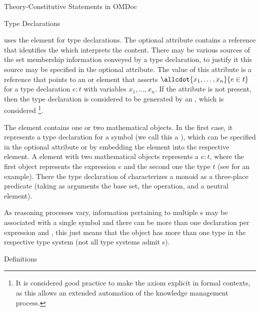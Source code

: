 \begin{omgroup}[short=Mathematical Statements,id=statements]
\begin{omgroup}[id=constitutive-statements]{Theory-Constitutive Statements in OMDoc}
\begin{module}[id=constitutive-statements]
\begin{omgroup}[id=type-axioms]{Type Declarations}
\begin{definition} [id=type.def]
  {\omdoc} uses the {} element for type declarations. The optional attribute
  {} contains a {} reference that identifies the
  {} which interprets the content. There may be various sources of
  the set membership information conveyed by a type declaration, to justify it this source
  may be specified in the optional {} attribute. The value of
  this attribute is a {} reference that points to an {}
  or {} element that asserts $\allcdot{x_1,\ldots,x_n}{e\in t}$ for a type
  declaration $e\colon t$ with variables $x_1,\ldots,x_n$.  If the
  {} attribute is not present, then the type declaration is
  considered to be generated by an {}, which is considered
  {}\footnote{It is considered good practice to make the
    axiom explicit in formal contexts, as this allows an extended automation of the
    knowledge management process.}.
  
  The {} element contains one or two mathematical objects. In the first
  case, it represents a type declaration for a symbol (we call this a
  {}), which can be specified in the optional
  {} attribute or by embedding the {} element into the
  respective {} element.  A {} element with two mathematical
  objects represents a {} $e\colon t$, where the first object
  represents the expression $e$ and the second one the type $t$ (see
  {} for an example). There the type declaration of
  {} characterizes a monoid as a three-place predicate (taking as
  arguments the base set, the operation, and a neutral element).
\end{definition}    

As reasoning processes vary, information pertaining to multiple {s}
may be associated with a single symbol and there can be more than one {}
declaration per expression and {}, this just means that the object
has more than one type in the respective type system (not all type systems admit
{s}).
\end{omgroup}

\begin{omgroup}[id=definitions]{Definitions}


\end{omgroup}
\end{module}
\end{omgroup}
\end{omgroup}
